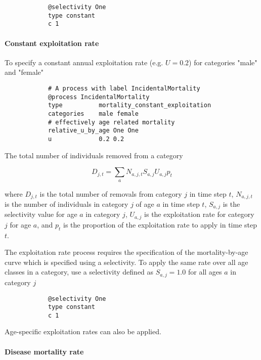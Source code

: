 {\small{\begin{verbatim}
			@selectivity One
			type constant
			c 1
\end{verbatim}}}

\paragraph{Constant exploitation rate}\label{sec:Process-MortalityConstantExploitation} 

To specify a constant annual exploitation rate (e.g. $U=0.2$) for categories "male" and "female"

{\small{\begin{verbatim}
			# A process with label IncidentalMortality
			@process IncidentalMortality
			type          mortality_constant_exploitation
			categories    male female
			# effectively age related mortality
			relative_u_by_age One One
			u             0.2 0.2
\end{verbatim}}}

The total number of individuals removed from a category

\begin{equation}
	D_{j,t} = \sum_a N_{a,j,t} S_{a,j} U_{a,j} p_t
\end{equation}

where $D_{j,t}$ is the total number of removals from category $j$ in time step $t$, $N_{a,j,t}$ is the number of individuals in category $j$ of age $a$ in time step $t$, $S_{a,j}$ is the selectivity value for age $a$ in category $j$, $U_{a,j}$ is the exploitation rate for category $j$ for age $a$, and $p_t$ is the proportion of the exploitation rate to apply in time step $t$.

The exploitation rate process requires the specification of the mortality-by-age curve which is specified using a selectivity. To apply the same rate over all age classes in a category, use a selectivity defined as $S_{a,j}=1.0$ for all ages $a$ in category $j$

{\small{\begin{verbatim}
			@selectivity One
			type constant
			c 1
\end{verbatim}}}

Age-specific exploitation rates can also be applied.

\paragraph{Disease mortality rate}\label{sec:Process-Age-DiseaseMortalityRate}\label{sec:Process-MortalityDiseaseRate}

